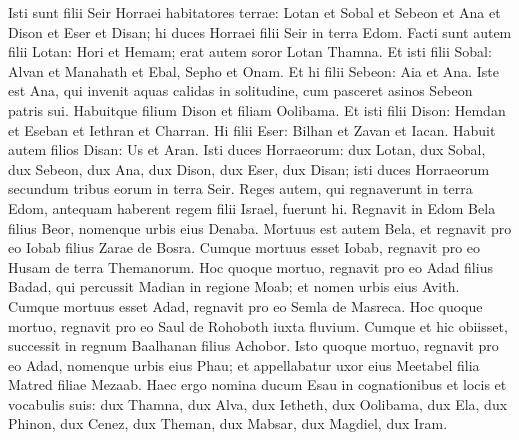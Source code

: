 \begin{biblechapter}
\begin{biblechapter}
\begin{biblechapter}
\begin{biblechapter}
\begin{biblechapter}
\begin{biblechapter}
\begin{biblechapter}
\begin{biblechapter}
\begin{biblechapter}
\begin{biblechapter}
\begin{biblechapter}
\begin{biblechapter}
\begin{biblechapter}
\begin{biblechapter}
\begin{biblechapter}
\begin{biblechapter}
\begin{biblechapter}
\begin{biblechapter}
\begin{biblechapter}
\begin{biblechapter}
\begin{biblechapter}
\begin{biblechapter}
\begin{biblechapter}
\begin{biblechapter}
\begin{biblechapter}
\begin{biblechapter}
\begin{biblechapter}
\begin{biblechapter}
\begin{biblechapter}
\begin{biblechapter}
\begin{biblechapter}
\begin{biblechapter}
\begin{biblechapter}
\begin{biblechapter}
\begin{biblechapter}
\begin{biblechapter}
 \verse Isti sunt filii Seir Horraei habitatores terrae: Lotan et Sobal et Sebeon et Ana 
\verse et Dison et Eser et Disan; hi duces Horraei filii Seir in terra Edom. 
 \verse Facti sunt autem filii Lotan: Hori et Hemam; erat autem soror Lotan Thamna. 
 \verse Et isti filii Sobal: Alvan et Manahath et Ebal, Sepho et Onam. 
\verse Et hi filii Sebeon: Aia et Ana. Iste est Ana, qui invenit aquas calidas in solitudine, cum pasceret asinos Sebeon patris sui. 
\verse Habuitque filium Dison et filiam Oolibama. 
\verse Et isti filii Dison: Hemdan et Eseban et Iethran et Charran. 
\verse Hi filii Eser: Bilhan et Zavan et Iacan. 
\verse Habuit autem filios Disan: Us et Aran.
 \verse Isti duces Horraeorum: dux Lotan, dux Sobal, dux Sebeon, dux Ana, 
\verse dux Dison, dux Eser, dux Disan; isti duces Horraeorum secundum tribus eorum in terra Seir.
 \verse Reges autem, qui regnaverunt in terra Edom, antequam haberent regem filii Israel, fuerunt hi. 
\verse Regnavit in Edom Bela filius Beor, nomenque urbis eius Denaba. 
\verse Mortuus est autem Bela, et regnavit pro eo Iobab filius Zarae de Bosra. 
\verse Cumque mortuus esset Iobab, regnavit pro eo Husam de terra Themanorum. 
\verse Hoc quoque mortuo, regnavit pro eo Adad filius Badad, qui percussit Madian in regione Moab; et nomen urbis eius Avith. 
\verse Cumque mortuus esset Adad, regnavit pro eo Semla de Masreca. 
\verse Hoc quoque mortuo, regnavit pro eo Saul de Rohoboth iuxta fluvium. 
\verse Cumque et hic obiisset, successit in regnum Baalhanan filius Achobor. 
\verse Isto quoque mortuo, regnavit pro eo Adad, nomenque urbis eius Phau; et appellabatur uxor eius Meetabel filia Matred filiae Mezaab.
 \verse Haec ergo nomina ducum Esau in cognationibus et locis et vocabulis suis: dux Thamna, dux Alva, dux Ietheth, 
\verse dux Oolibama, dux Ela, dux Phinon, 
\verse dux Cenez, dux Theman, dux Mabsar, 
\verse dux Magdiel, dux Iram.

\end{biblechapter}
\end{biblechapter}
\end{biblechapter}
\end{biblechapter}
\end{biblechapter}
\end{biblechapter}
\end{biblechapter}
\end{biblechapter}
\end{biblechapter}
\end{biblechapter}
\end{biblechapter}
\end{biblechapter}
\end{biblechapter}
\end{biblechapter}
\end{biblechapter}
\end{biblechapter}
\end{biblechapter}
\end{biblechapter}
\end{biblechapter}
\end{biblechapter}
\end{biblechapter}
\end{biblechapter}
\end{biblechapter}
\end{biblechapter}
\end{biblechapter}
\end{biblechapter}
\end{biblechapter}
\end{biblechapter}
\end{biblechapter}
\end{biblechapter}
\end{biblechapter}
\end{biblechapter}
\end{biblechapter}
\end{biblechapter}
\end{biblechapter}
\end{biblechapter}
